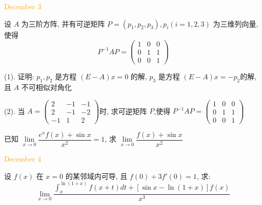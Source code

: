\begin{solution}
	
\end{solution}


\textcolor{orange}{December 3}

\begin{example}[][Exam: 38.1.5]
	设 $A$ 为三阶方阵, 并有可逆矩阵 $P=(p_{1},p_{2},p_{3}), p_{i}(i=1,2,3)$ 为三维列向量, 使得
$$ P^{-1}AP =
\begin{pmatrix}
	1 & 0 & 0\\
	0 & 1 & 1\\
	0 & 0 & 1
\end{pmatrix}
$$

(1). 证明: $p_{1},p_{2}$ 是方程 $(E-A)x=0$ 的解, $p_{3}$ 是方程 $(E-A)x=-p_{2}$的解, 且 $A$ 不可相似对角化

(2). 当 $A=
\begin{pmatrix}
	2 & -1 & -1\\
	2 & -1 & -2\\
   -1 &  1 &  2
\end{pmatrix}$时, 求可逆矩阵 $P$,使得 $P^{-1}AP=
\begin{pmatrix}
	1 & 0 & 0\\
	0 & 1 & 1\\
	0 & 0 & 1
\end{pmatrix}$
\end{example}

\begin{solution}
	
\end{solution}

\begin{example}[][Exam: 38.1.6]
	已知 $\lim\limits_{x\to 0}\dfrac{e^{x}f(x)+\sin x}{x^{2}}=1$, 求 $\lim\limits_{x\to 0}\dfrac{f(x)+\sin x}{x^{2}}$
\end{example}
\begin{solution}
	
\end{solution}

\textcolor{orange}{December 4}

\begin{example}[][Exam: 38.1.7]
	设 $f(x)$ 在 $x=0$ 的某邻域内可导, 且 $f(0)+3f'(0)=1$, 求:
	$$\lim\limits_{x\to 0}\dfrac{\int_{x}^{\ln(1+x)}f(x+t)dt+\left[\sin x-\ln(1+x)\right]f(x)}{x^{3}}$$
\end{example}
\begin{solution}
	
\end{solution}

